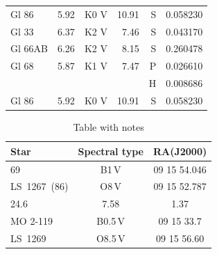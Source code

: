 \documentclass{aa}
\begin{document}
{\begin{landscape}
\begin{longtable}{lllrrr}
			Gl 86     & 5.92    & K0 V     & 10.91    & S    & 0.058230    \\   Gl 33    & 6.37 & K2 V & 7.46 & S & 0.043170\\
			Gl 66AB   & 6.26    & K2 V     & 8.15     & S    & 0.260478    \\
			Gl 68     & 5.87    & K1 V     & 7.47     & P    & 0.026610    \\
			          &         &          &          & H    & 0.008686    \\
			Gl 86     & 5.92    & K0 V     & 10.91    & S    & 0.058230    \\
		\end{longtable}
	\end{landscape}
}


\begin{table}[ht!]
	\caption{\label{t7}Table with notes}
	\centering
	\begin{tabular}{lcc}
		\hline\hline
		Star         & Spectral type & RA(J2000)    \\
		\hline
		69           & B1\,V         & 09 15 54.046 \\
		LS~1267~(86) & O8\,V         & 09 15 52.787 \\
		24.6         & 7.58          & 1.37         \\
		\hline
		MO 2-119     & B0.5\,V       & 09 15 33.7   \\
		LS~1269      & O8.5\,V       & 09 15 56.60  \\
		\hline
	\end{tabular}
\end{table}
\end{document}
